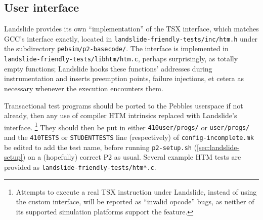 \subsection{User interface}
\label{sec:tm-interface}

Landslide provides its own ``implementation'' of the TSX interface,
which matches GCC's interface exactly,
located in {\tt landslide-friendly-tests/inc/htm.h}
under the subdirectory {\tt pebsim/p2-basecode/}.
The interface is implemented in {\tt landslide-friendly-tests/\allowbreak{}libhtm/htm.c},
perhaps surprisingly, as totally empty functions;
Landslide hooks these functions' addresses during instrumentation
and inserts preemption points, failure injections,
et cetera as necessary whenever the execution encounters them.

Transactional test programs should be ported to the Pebbles userspace if not already,
then any use of compiler HTM intrinsics replaced with Landslide's interface.%
\footnote{Attempts to execute a real TSX instruction under Landslide, instead of using the custom interface,
will be reported as ``invalid opcode'' bugs,
as neither of its supported simulation platforms support the feature.
}
They should then be put in either {\tt 410user/progs/} or {\tt user/progs/}
and the {\tt 410TESTS} or {\tt STUDENTTESTS} line (respectively) of {\tt config-incomplete.mk} be edited to add the test name,
before running {\tt p2-setup.sh} (\cref{sec:landslide-setup})
on a (hopefully) correct P2 as usual.
Several example HTM tests are provided as {\tt landslide-friendly-tests/htm*.c}.

